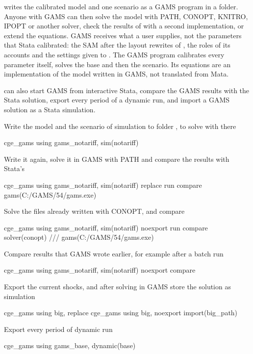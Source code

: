 

 writes the calibrated model and one scenario as a GAMS program
in a folder. Anyone with GAMS can then solve the model with PATH, CONOPT,
KNITRO, IPOPT or another solver, check the results of \pkg with a second
implementation, or extend the equations. GAMS receives what a user supplies,
not the parameters that Stata calibrated: the SAM after the layout rewrites
of , the roles of its accounts and the settings given to
. The GAMS program calibrates every parameter itself,
solves the base and then the scenario. Its equations are an implementation
of the model written in GAMS, not translated from Mata.

 can also start GAMS from interactive Stata, compare the GAMS
results with the Stata solution, export every period of a dynamic run, and
import a GAMS solution as a Stata simulation.


Write the model and the scenario of simulation  to folder
, to solve with  there
\begin{stcode}
cge_gams using gams_notariff, sim(notariff)
\end{stcode}
Write it again, solve it in GAMS with PATH and compare the results with Stata's
\begin{stcode}
cge_gams using gams_notariff, sim(notariff) replace run compare gams(C:/GAMS/54/gams.exe)
\end{stcode}
Solve the files already written with CONOPT, and compare
\begin{stcode}
cge_gams using gams_notariff, sim(notariff) noexport run compare solver(conopt) ///
    gams(C:/GAMS/54/gams.exe)
\end{stcode}
Compare results that GAMS wrote earlier, for example after a batch run
\begin{stcode}
cge_gams using gams_notariff, sim(notariff) noexport compare
\end{stcode}
Export the current shocks, and after solving in GAMS store the solution as
simulation 
\begin{stcode}
cge_gams using big, replace
cge_gams using big, noexport import(big_path)
\end{stcode}
Export every period of dynamic run 
\begin{stcode}
cge_gams using gams_base, dynamic(base)
\end{stcode}


